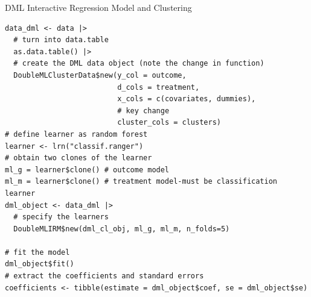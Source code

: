 \documentclass[10pt,table,aspectratio=169]{beamer}
\begin{document}
\begin{frame}[plain,fragile,label=two_dimensions]{DML Interactive Regression Model and Clustering}
\begin{verbatim}
data_dml <- data |>
  # turn into data.table
  as.data.table() |>
  # create the DML data object (note the change in function)
  DoubleMLClusterData$new(y_col = outcome,
                          d_cols = treatment,
                          x_cols = c(covariates, dummies),
                          # key change
                          cluster_cols = clusters)
# define learner as random forest
learner <- lrn("classif.ranger")
# obtain two clones of the learner
ml_g = learner$clone() # outcome model
ml_m = learner$clone() # treatment model-must be classification learner 
dml_object <- data_dml |>
  # specify the learners
  DoubleMLIRM$new(dml_cl_obj, ml_g, ml_m, n_folds=5)

# fit the model
dml_object$fit()
# extract the coefficients and standard errors
coefficients <- tibble(estimate = dml_object$coef, se = dml_object$se)
\end{verbatim}
\end{frame}
\end{document}
